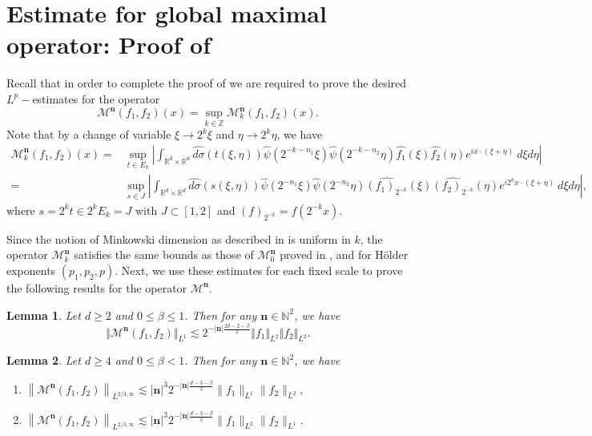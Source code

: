 \documentclass[a4paper,reqno]{amsart}
\newtheorem{lemma}{Lemma}[section]
\numberwithin{equation}{section}
\newcommand{\R}{{\mathbb {R}}}
\newcommand{\N}{{\mathbb N}}
\newcommand{\Z}{{\mathbb Z}}
\begin{document}
	\section{Estimate for global maximal operator: Proof of }\label{full}
	Recall that in order to complete the proof of  we are required to prove the desired $L^p-$estimates for the operator 
	\[\mathcal{M}^{\mathbf{n}}(f_1,f_2)(x)=\sup_{k\in \Z}\mathcal{M}^{\mathbf{n}}_k(f_1,f_2)(x).\]
	Note that by a change of variable $\xi\to 2^k\xi$ and $\eta\to2^k\eta$, we have
	\begin{align}\label{scaling}
		\mathcal{M}^{\mathbf{n}}_k(f_1,f_2)(x)=&\sup_{t\in E_k}\left|\int_{\R^d\times\R^d}\widehat{d\sigma}(t(\xi,\eta))\widehat{\psi}\left(2^{-k-n_1} \xi\right)\widehat{\psi}\left(2^{-k-n_2} \eta\right)\widehat{f_1}(\xi)\widehat{f_2}(\eta)e^{ix\cdot(\xi+\eta)}~d\xi d\eta\right|\\
		=&\nonumber\sup_{s\in J}\left|\int_{\R^d\times\R^d}\widehat{d\sigma}(s(\xi,\eta))\widehat{\psi}\left(2^{-n_1} \xi\right)\widehat{\psi}\left(2^{-n_2} \eta\right)\widehat{(f_1)_{2^{-k}}}(\xi)\widehat{(f_2)_{2^{-k}}}(\eta)e^{i2^kx\cdot(\xi+\eta)}~d\xi d\eta\right|,
	\end{align}
	where $s=2^kt\in 2^kE_k=J$ with $J\subset[1,2]$ and $(f)_{2^{-k}}=f(2^{-k}x)$.
	
	
	Since the notion of Minkowski dimension as described in  is uniform in $k$, the operator $\mathcal{M}^{\mathbf{n}}_k$ satisfies the same bounds as those of $\mathcal{M}^{\mathbf{n}}_0$ proved in ,  and  for H\"{o}lder exponents $(p_1,p_2,p)$. Next, we use these estimates for each fixed scale to prove the following results for the operator $\mathcal{M}^{\mathbf{n}}$. 
	\begin{lemma}\label{L2}
		Let $d\geq2$ and $0\leq \beta\leq1$. Then for any $\mathbf{n}\in\N^2$, we have
		\[\Vert \mathcal{M}^{\mathbf{n}}(f_1,f_2)\Vert_{L^1}\lesssim 2^{-|\mathbf{n}|\frac{2d-2-\beta}{2}}\Vert f_1\Vert_{L^2}\Vert f_2\Vert_{L^2}.\]
	\end{lemma}
	
	\begin{lemma}\label{L2/3}
		Let $d\geq4$ and $0\leq \beta<1$. Then for any $\mathbf{n}\in\N^2$, we have
		\begin{enumerate}
			\item $\left\|\mathcal{M}^{\mathbf{n}}(f_1,f_2)\right\|_{L^{2/3,\infty}}\lesssim |\mathbf{n}|^{3} 2^{-|\mathbf{n}|\frac{d-3-\beta}{2}}\|f_1\|_{L^1}\|f_2\|_{L^2},$
			\item $\left\|\mathcal{M}^{\mathbf{n}}(f_1,f_2)\right\|_{L^{2/3,\infty}}\lesssim |\mathbf{n}|^{3} 2^{-|\mathbf{n}|\frac{d-3-\beta}{2}}\|f_1\|_{L^2}\|f_2\|_{L^1}$.
		\end{enumerate}
	\end{lemma}
	
\end{document}
